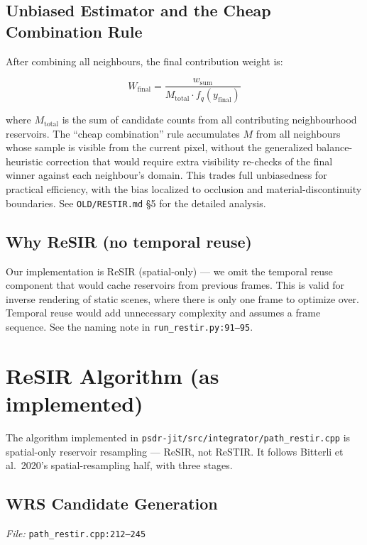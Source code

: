 \subsection{Unbiased Estimator and the Cheap Combination Rule}

After combining all neighbours, the final contribution weight is:

\[
W_{\text{final}} = \frac{w_{\text{sum}}}{M_{\text{total}} \cdot f_q(y_{\text{final}})}
\]

where $M_{\text{total}}$ is the sum of candidate counts from all contributing
neighbourhood reservoirs. The ``cheap combination'' rule accumulates $M$ from
all neighbours whose sample is visible from the current pixel, without the
generalized balance-heuristic correction that would require extra visibility
re-checks of the final winner against each neighbour's domain. This trades full
unbiasedness for practical efficiency, with the bias localized to occlusion and
material-discontinuity boundaries. See \texttt{OLD/RESTIR.md} \S5 for
the detailed analysis.

\subsection{Why ReSIR (no temporal reuse)}

Our implementation is ReSIR (spatial-only) --- we omit the temporal reuse
component that would cache reservoirs from previous frames. This is valid for
inverse rendering of static scenes, where there is only one frame to optimize
over. Temporal reuse would add unnecessary complexity and assumes a frame
sequence. See the naming note in \texttt{run\_restir.py:91--95}.

\section{ReSIR Algorithm (as implemented)}

The algorithm implemented in \texttt{psdr-jit/src/integrator/path\_restir.cpp}
is spatial-only reservoir resampling --- ReSIR, not ReSTIR. It follows
Bitterli et al.\ 2020's spatial-resampling half, with three stages.

\subsection{WRS Candidate Generation}
\label{sec:wrs}

\emph{File:} \texttt{path\_restir.cpp:212--245}

